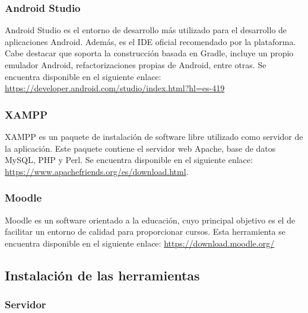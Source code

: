 \subsubsection{Android Studio}

Android Studio es el entorno de desarrollo más utilizado para el desarrollo de aplicaciones Android. Además, es el IDE oficial recomendado por la plataforma. Cabe destacar que soporta la construcción basada en Gradle, incluye un propio emulador Android, refactorizaciones propias de Android, entre otras. Se encuentra disponible en el siguiente enlace: \url{https://developer.android.com/studio/index.html?hl=es-419}

\subsubsection{XAMPP}

XAMPP es un paquete de instalación de software libre utilizado como servidor de la aplicación. Este paquete contiene el servidor web Apache, base de datos MySQL, PHP y Perl. Se encuentra disponible en el siguiente enlace: \url{https://www.apachefriends.org/es/download.html}.

\subsubsection{Moodle}

Moodle es un software orientado a la educación, cuyo principal objetivo es el de facilitar un entorno de calidad para proporcionar cursos. Esta herramienta se encuentra disponible en el siguiente enlace: \url{https://download.moodle.org/}

\subsection{Instalación de las herramientas}\label{subsubsec:InstHerramientas}


\subsubsection{Servidor}

